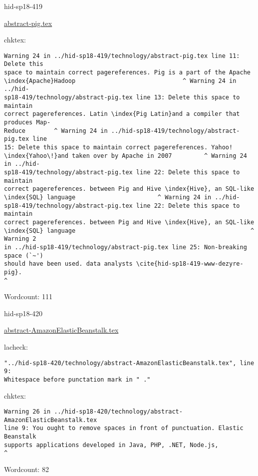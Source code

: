 \begin{IU}

hid-sp18-419

\href{https://github.com/cloudmesh-community/hid-sp18-419/blob/master//technology/abstract-pig.tex}{abstract-pig.tex}

 
chktex:
\begin{tiny}
\begin{verbatim}
Warning 24 in ../hid-sp18-419/technology/abstract-pig.tex line 11: Delete this
space to maintain correct pagereferences. Pig is a part of the Apache
\index{Apache}Hadoop                              ^ Warning 24 in ../hid-
sp18-419/technology/abstract-pig.tex line 13: Delete this space to maintain
correct pagereferences. Latin \index{Pig Latin}and a compiler that produces Map-
Reduce        ^ Warning 24 in ../hid-sp18-419/technology/abstract-pig.tex line
15: Delete this space to maintain correct pagereferences. Yahoo!
\index{Yahoo\!}and taken over by Apache in 2007         ^ Warning 24 in ../hid-
sp18-419/technology/abstract-pig.tex line 22: Delete this space to maintain
correct pagereferences. between Pig and Hive \index{Hive}, an SQL-like
\index{SQL} language                       ^ Warning 24 in ../hid-
sp18-419/technology/abstract-pig.tex line 22: Delete this space to maintain
correct pagereferences. between Pig and Hive \index{Hive}, an SQL-like
\index{SQL} language                                                 ^ Warning 2
in ../hid-sp18-419/technology/abstract-pig.tex line 25: Non-breaking space (`~')
should have been used. data analysts \cite{hid-sp18-419-www-dezyre-pig}.
^
\end{verbatim}
\end{tiny}

Wordcount: 111

\end{IU}



\begin{IU}

hid-sp18-420

\href{https://github.com/cloudmesh-community/hid-sp18-420/blob/master//technology/abstract-AmazonElasticBeanstalk.tex}{abstract-AmazonElasticBeanstalk.tex}

 
lacheck:
\begin{tiny}
\begin{verbatim}
"../hid-sp18-420/technology/abstract-AmazonElasticBeanstalk.tex", line 9:
Whitespace before punctation mark in " ."
\end{verbatim}
\end{tiny}
chktex:
\begin{tiny}
\begin{verbatim}
Warning 26 in ../hid-sp18-420/technology/abstract-AmazonElasticBeanstalk.tex
line 9: You ought to remove spaces in front of punctuation. Elastic Beanstalk
supports applications developed in Java, PHP, .NET, Node.js,
^
\end{verbatim}
\end{tiny}

Wordcount: 82

\end{IU}

